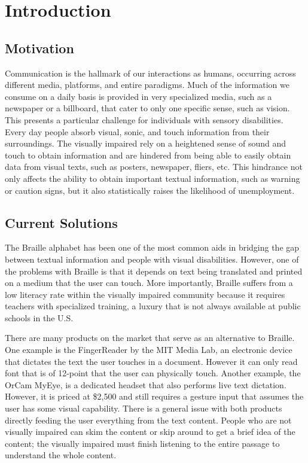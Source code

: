\chapter{Introduction}

\section{Motivation}

Communication is the hallmark of our interactions as humans, occurring across different media, platforms, and entire paradigms. Much of the information we consume on a daily basis is provided in very specialized media, such as a newspaper or a billboard, that cater to only one specific sense, such as vision. This presents a particular challenge for individuals with sensory disabilities. Every day people absorb visual, sonic, and touch information from their surroundings. The visually impaired rely on a heightened sense of sound and touch to obtain information and are hindered from being able to easily obtain data from visual texts, such as posters, newspaper, fliers, etc. This hindrance not only affects the ability to obtain important textual information, such as warning or caution signs, but it also statistically raises the likelihood of unemployment.

\section{Current Solutions}

The Braille alphabet has been one of the most common aids in bridging the gap between textual information and people with visual disabilities. However, one of the problems with Braille is that it depends on text being translated and printed on a medium that the user can touch. More importantly, Braille suffers from a low literacy rate within the visually impaired community because it requires teachers with specialized training, a luxury that is not always available at public schools in the U.S.
	
There are many products on the market that serve as an alternative to Braille. One example is the FingerReader by the MIT Media Lab, an electronic device that dictates the text the user touches in a document. However it can only read font that is of 12-point that the user can physically touch. Another example, the OrCam MyEye, is a dedicated headset that also performs live text dictation. However, it is priced at \$2,500 and still requires a gesture input that assumes the user has some visual capability. There is a general issue with both products directly feeding the user everything from the text content. People who are not visually impaired can skim the content or skip around to get a brief idea of the content; the visually impaired must finish listening to the entire passage to understand the whole content.


